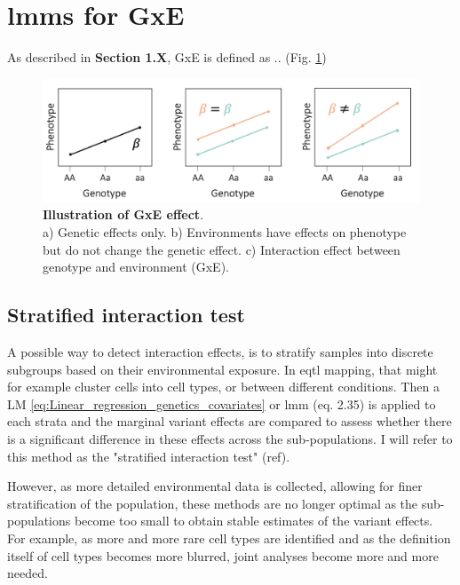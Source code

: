 \newpage 


\section{\gls{lmm}s for GxE}

As described in \textbf{Section 1.X}, GxE is defined as .. (Fig. \ref{fig:gxe})

\begin{figure}[h]
\centering
\includegraphics[width=15cm]{Chapter1/Fig/GxE.png}
\caption[\textbf{Illustration of GxE}]{\textbf{Illustration of GxE effect}.\\
a) Genetic effects only. b) Environments have effects on phenotype but do not change the genetic effect. c) Interaction effect between genotype and environment (GxE).}
\label{fig:gxe}
\end{figure}

\subsection{Stratified interaction test}

A possible way to detect interaction effects, is to stratify samples into discrete subgroups based on their environmental exposure.
In e\gls{qtl} mapping, that might for example cluster cells into cell types, or between different conditions.
Then a LM \eqref{eq:Linear_regression_genetics_covariates} or \gls{lmm} (eq. 2.35) is applied to each strata and the marginal variant effects are compared to assess whether there is a significant difference in these effects across the sub-populations.
I will refer to this method as the "stratified interaction test" (ref).

However, as more detailed environmental data is collected, allowing for finer stratification of the population, these methods are no longer optimal as the sub-populations become too small to obtain stable estimates of the variant effects.
For example, as more and more rare cell types are identified and as the definition itself of cell types becomes more blurred, joint analyses become more and more needed. 

